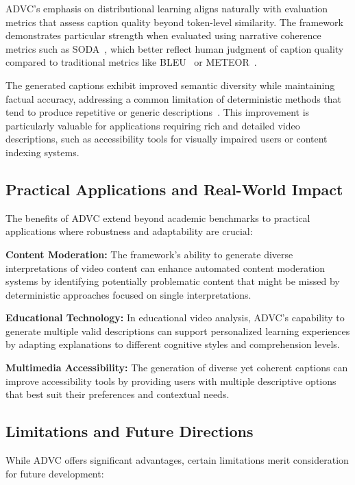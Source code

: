 ADVC's emphasis on distributional learning aligns naturally with evaluation metrics that assess caption quality beyond token-level similarity. The framework demonstrates particular strength when evaluated using narrative coherence metrics such as SODA~\cite{Fujita2020-ob}, which better reflect human judgment of caption quality compared to traditional metrics like BLEU~\cite{Papineni2002-sn} or METEOR~\cite{Banerjee2005-zo}.

The generated captions exhibit improved semantic diversity while maintaining factual accuracy, addressing a common limitation of deterministic methods that tend to produce repetitive or generic descriptions~\cite{Wang2019-tk,wang2019describing}. This improvement is particularly valuable for applications requiring rich and detailed video descriptions, such as accessibility tools for visually impaired users or content indexing systems.

\subsection{Practical Applications and Real-World Impact}

The benefits of ADVC extend beyond academic benchmarks to practical applications where robustness and adaptability are crucial:

\textbf{Content Moderation:} The framework's ability to generate diverse interpretations of video content can enhance automated content moderation systems by identifying potentially problematic content that might be missed by deterministic approaches focused on single interpretations.

\textbf{Educational Technology:} In educational video analysis, ADVC's capability to generate multiple valid descriptions can support personalized learning experiences by adapting explanations to different cognitive styles and comprehension levels.

\textbf{Multimedia Accessibility:} The generation of diverse yet coherent captions can improve accessibility tools by providing users with multiple descriptive options that best suit their preferences and contextual needs.

\subsection{Limitations and Future Directions}

While ADVC offers significant advantages, certain limitations merit consideration for future development:

